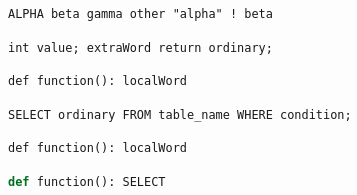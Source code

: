 \documentclass{article}
\begin{document}
\begin{lstlisting}[language=Private]
ALPHA beta gamma other "alpha" ! beta
\end{lstlisting}
\begin{lstlisting}[language={[Extended]C}]
int value; extraWord return ordinary;
\end{lstlisting}
\begin{lstlisting}
def function(): localWord
\end{lstlisting}
{\lstset{language=SQL}
\begin{lstlisting}
SELECT ordinary FROM table_name WHERE condition;
\end{lstlisting}
}
\begin{lstlisting}
def function(): localWord
\end{lstlisting}
\begin{lstlisting}[language=Python,alsolanguage=SQL]
def function(): SELECT
\end{lstlisting}
\end{document}
